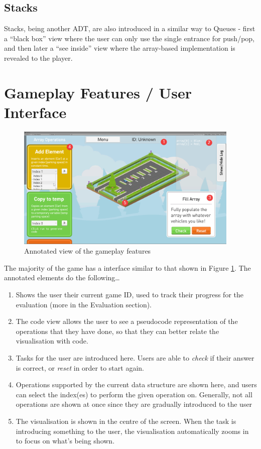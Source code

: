 \documentclass[11pt]{article}
\begin{document}
\subsection{Stacks}
Stacks, being another ADT, are also introduced in a similar way to Queues - first a ``black box'' view where the user can only use the single entrance for push/pop, and then later a ``see inside'' view where the array-based implementation is revealed to the player.
\section{Gameplay Features / User Interface}
\begin{figure}
  \centering
  \includegraphics[width=0.95\textwidth]{images/annotatedelements.png}
\caption{Annotated view of the gameplay features}
\label{fig:annotatedelements}
\end{figure}
The majority of the game has a interface similar to that shown in Figure \ref{fig:annotatedelements}. The annotated elements do the following\dots
\begin{spacing}{1.5}
\begin{enumerate}
  \item Shows the user their current game ID, used to track their progress for the evaluation (more in the Evaluation section).
  \item The code view allows the user to see a pseudocode representation of the operations that they have done, so that they can better relate the visualisation with code.
  \item Tasks for the user are introduced here. Users are able to \emph{check} if their answer is correct, or \emph{reset} in order to start again.
  \item Operations supported by the current data structure are shown here, and users can select the index(es) to perform the given operation on. Generally, not all operations are shown at once since they are gradually introduced to the user
  \item The visualisation is shown in the centre of the screen. When the task is introducing something to the user, the visualisation automatically zooms in to focus on what's being shown.
\end{enumerate}
\end{spacing}
\end{document}
